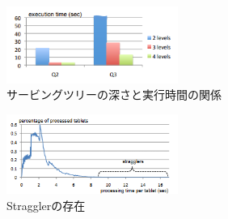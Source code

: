 \documentclass[dvipdfmx,uplatex]{jsarticle}
\theoremstyle{remark}
\begin{document}
\begin{figure}
    \centering
    \includegraphics[width=0.5\textwidth]{img/dremel/serving-tree.png}
    \caption{サービングツリーの深さと実行時間の関係}
    \label{fig:serving-tree}
\end{figure}

\begin{figure}
    \centering
    \includegraphics[width=0.5\textwidth]{img/dremel/stragglers.png}
    \caption{Stragglerの存在}
    \label{fig:straggler}
\end{figure}
\end{document}
